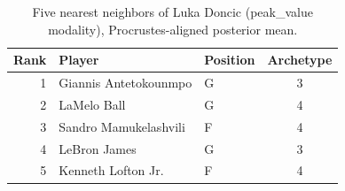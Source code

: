 \begin{table}[htbp]
  \centering\small
  \begin{tabular}{rllc}
    \toprule
    Rank & Player & Position & Archetype \\
    \midrule
    1 & Giannis Antetokounmpo & G & 3 \\
    2 & LaMelo Ball & G & 4 \\
    3 & Sandro Mamukelashvili & F & 4 \\
    4 & LeBron James & G & 3 \\
    5 & Kenneth Lofton Jr. & F & 4 \\
    \bottomrule
  \end{tabular}
  \caption{Five nearest neighbors of Luka Doncic (peak_value modality), Procrustes-aligned posterior mean.}
  \label{tab:Luka_Doncic_neighbors_peak_value}
\end{table}

